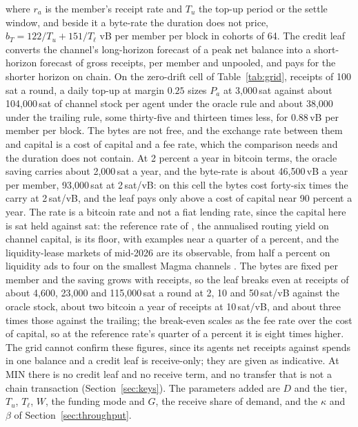 \documentclass[11pt]{article}
\theoremstyle{plain}
\theoremstyle{definition}
\theoremstyle{remark}
\begin{document}
where $r_a$ is the member's receipt rate and $T_u$ the top-up period or the settle window, and beside it a byte-rate the duration does not price, $b_T=122/T_u+151/T_\ell$ vB per member per block in cohorts of 64. The credit leaf converts the channel's long-horizon forecast of a peak net balance into a short-horizon forecast of gross receipts, per member and unpooled, and pays for the shorter horizon on chain. On the zero-drift cell of Table~\ref{tab:grid}, receipts of 100\,sat a round, a daily top-up at margin $0.25$ sizes $P_a$ at 3{,}000\,sat against about 104{,}000\,sat of channel stock per agent under the oracle rule and about 38{,}000 under the trailing rule, some thirty-five and thirteen times less, for 0.88\,vB per member per block. The bytes are not free, and the exchange rate between them and capital is a cost of capital and a fee rate, which the comparison needs and the duration does not contain. At 2 percent a year in bitcoin terms, the oracle saving carries about 2{,}000\,sat a year, and the byte-rate is about 46{,}500\,vB a year per member, 93{,}000\,sat at 2\,sat/vB: on this cell the bytes cost forty-six times the carry at 2\,sat/vB, and the leaf pays only above a cost of capital near 90 percent a year. The rate is a bitcoin rate and not a fiat lending rate, since the capital here is sat held against sat: the reference rate of \citet{bhatia2019lnrr}, the annualised routing yield on channel capital, is its floor, with examples near a quarter of a percent, and the liquidity-lease markets of mid-2026 are its observable, from half a percent on liquidity ads to four on the smallest Magma channels \citep{spark2026inbound}. The bytes are fixed per member and the saving grows with receipts, so the leaf breaks even at receipts of about 4{,}600, 23{,}000 and 115{,}000\,sat a round at 2, 10 and 50\,sat/vB against the oracle stock, about two bitcoin a year of receipts at 10\,sat/vB, and about three times those against the trailing; the break-even scales as the fee rate over the cost of capital, so at the reference rate's quarter of a percent it is eight times higher. The grid cannot confirm these figures, since its agents net receipts against spends in one balance and a credit leaf is receive-only; they are given as indicative. At MIN there is no credit leaf and no receive term, and no transfer that is not a chain transaction (Section~\ref{sec:keys}). The parameters added are $D$ and the tier, $T_u$, $T_\ell$, $W$, the funding mode and $G$, the receive share of demand, and the $\kappa$ and $\beta$ of Section~\ref{sec:throughput}.
\end{document}
